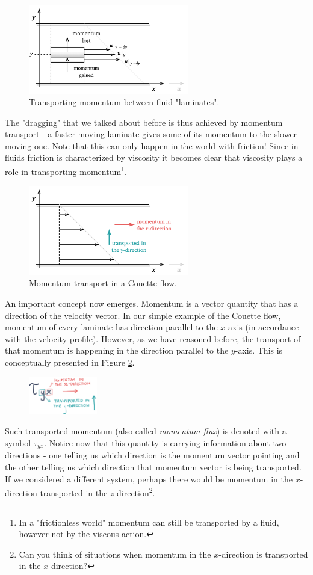 \documentclass[10pt,twocolumn]{article}
\begin{document}
\begin{figure}[H]
\centering\includegraphics[width=7cm]{momentum-transport-in-laminates.png}
\caption{Transporting momentum between fluid "laminates".}
\label{fig:momentum-transport-in-laminates}
\end{figure}
The "dragging" that we talked about before is thus achieved by momentum transport - a faster moving laminate gives some of its momentum to the slower moving one. Note that this can only happen in the world with friction! Since in fluids friction is characterized by viscosity it becomes clear that viscosity plays a role in transporting momentum\footnote{In a "frictionless world" momentum can still be transported by a fluid, however not by the viscous action.}.
\begin{figure}[H]
\centering\includegraphics[width=7cm]{couette-flow-momentum-transport.png}
\caption{Momentum transport in a Couette flow.}
\label{fig:couette-flow-momentum-transport}
\end{figure}
An important concept now emerges. Momentum is a vector quantity that has a direction of the velocity vector. In our simple example of the Couette flow, momentum of every laminate has direction parallel to the $x$-axis (in accordance with the velocity profile). However, as we have reasoned before, the transport of that momentum is happening in the direction parallel to the $y$-axis. This is conceptually presented in Figure \ref{fig:couette-flow-momentum-transport}. 

\begin{figure}
\centering\includegraphics[width=3cm]{tau_y_x.png}
\label{fig:tau_y_x}
\end{figure}
Such transported momentum (also called \textit{momentum flux}) is denoted with a symbol $\tau_{yx}$. Notice now that this quantity is carrying information about two directions - one telling us which direction is the momentum vector pointing and the other telling us which direction that momentum vector is being transported. If we considered a different system, perhaps there would be momentum in the $x$-direction transported in the $z$-direction\footnote{Can you think of situations when momentum in the $x$-direction is transported in the $x$-direction?}.
\end{document}
